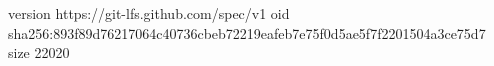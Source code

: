 version https://git-lfs.github.com/spec/v1
oid sha256:893f89d76217064c40736cbeb72219eafeb7e75f0d5ae5f7f2201504a3ce75d7
size 22020
